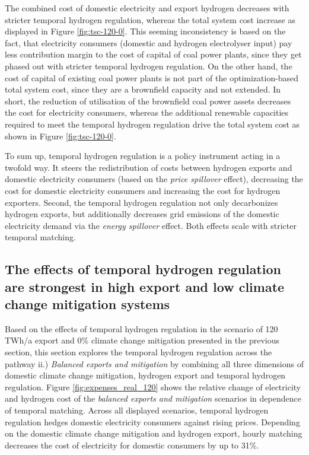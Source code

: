 The combined cost of domestic electricity and export hydrogen decreases with stricter temporal hydrogen regulation, whereas the total system cost increase as displayed in Figure \ref{fig:tsc-120-0}. This seeming inconsistency is based on the fact, that electricity consumers (domestic and hydrogen electrolyser input) pay less contribution margin to the cost of capital of coal power plants, since they get phased out with stricter temporal hydrogen regulation. On the other hand, the cost of capital of existing coal power plants is not part of the optimization-based total system cost, since they are a brownfield capacity and not extended. In short, the reduction of utilisation of the brownfield coal power assets decreases the cost for electricity consumers, whereas the additional renewable capacities required to meet the temporal hydrogen regulation drive the total system cost as shown in Figure \ref{fig:tsc-120-0}. 


To sum up, temporal hydrogen regulation is a policy instrument acting in a twofold way. It steers the redistribution of costs between hydrogen exports and domestic electricity consumers (based on the \textit{price spillover} effect), decreasing the cost for domestic electricity consumers and increasing the cost for hydrogen exporters. 
Second, the temporal hydrogen regulation 
not only decarbonizes hydrogen exports, but additionally decreases grid emissions of the domestic electricity demand via the \textit{energy spillover} effect. Both effects scale with stricter temporal matching.



\subsection*{The effects of temporal hydrogen regulation are strongest in high export and low climate change mitigation systems}
\label{subsec:rule_all}

Based on the effects of temporal hydrogen regulation in the scenario of 120 TWh/a export and 0\% climate change mitigation presented in the previous section, this section explores the temporal hydrogen regulation across the pathway ii.) \textit{Balanced exports and mitigation} by combining all three dimensions of domestic climate change mitigation, hydrogen export and temporal hydrogen regulation. Figure \ref{fig:expenses_real_120} shows the relative change of electricity and hydrogen cost of the \textit{balanced exports and mitigation} scenarios in dependence of temporal matching. 
Across all displayed scenarios, temporal hydrogen regulation hedges domestic electricity consumers against rising prices. Depending on the domestic climate change mitigation and hydrogen export, hourly matching decreases the cost of electricity for domestic consumers by up to 31\%.

